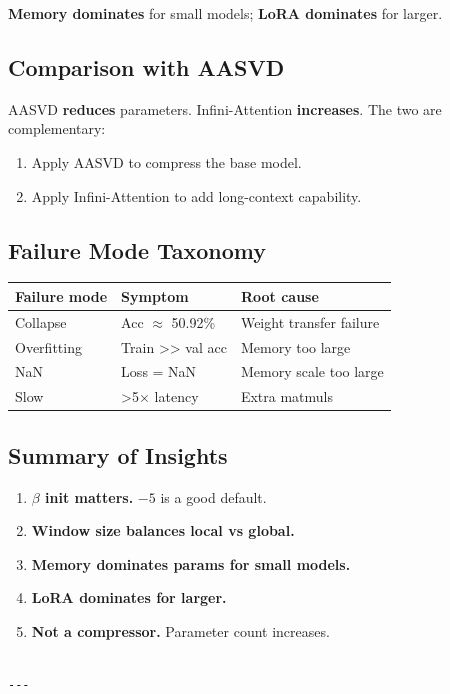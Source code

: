 \textbf{Memory dominates} for small models; \textbf{LoRA dominates} for larger.

\subsection{Comparison with AASVD}

AASVD \textbf{reduces} parameters. Infini-Attention \textbf{increases}. The two are 
complementary:

\begin{enumerate}
\item Apply AASVD to compress the base model.
\item Apply Infini-Attention to add long-context capability.

\end{enumerate}
\subsection{Failure Mode Taxonomy}

\begin{table}[H]
\centering
\small
\begin{tabular}{lll}
\toprule
\textbf{Failure mode} & \textbf{Symptom} & \textbf{Root cause} \\
\midrule
Collapse & Acc $\approx$ 50.92\% & Weight transfer failure \\
Overfitting & Train \textgreater{}\textgreater{} val acc & Memory too large \\
NaN & Loss = NaN & Memory scale too large \\
Slow & \textgreater{}5$\times$ latency & Extra matmuls \\
\bottomrule
\end{tabular}
\end{table}

\subsection{Summary of Insights}

\begin{enumerate}
\item \textbf{$\beta$ init matters.} $-5$ is a good default.
\item \textbf{Window size balances local vs global.}
\item \textbf{Memory dominates params for small models.}
\item \textbf{LoRA dominates for larger.}
\item \textbf{Not a compressor.} Parameter count increases.
\end{enumerate}
\begin{lstlisting}

---
\end{lstlisting}

